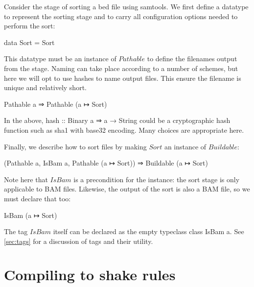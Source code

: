 \documentclass{article}
\begin{document}
\begin{example}
  \label{ex:sort}
  Consider the stage of sorting a bed file using samtools. We first define a
  datatype to represent the sorting stage and to carry all configuration options
  needed to perform the sort:
  \begin{haskell*}
    data Sort = Sort
  \end{haskell*}
  
  This datatype must be an instance of $Pathable$ to define the filenames output
  from the stage. Naming can take place according to a number of schemes, but
  here we will opt to use hashes to name output files. This ensure the filename
  is unique and relatively short.
  \begin{haskell*}
     Pathable a ⇒ Pathable (a ↦ Sort) 
  \end{haskell*}
  In the above, \<hash :: Binary a ⇒ a → String\> could be a cryptographic hash
  function such as sha1 with base32 encoding. Many choices are appropriate here.

  Finally, we describe how to sort files by making $Sort$ an instance of
  $Buildable$:
  \begin{haskell*}
     (Pathable a, IsBam a, Pathable (a ↦ Sort)) ⇒ Buildable (a ↦ Sort)  
  \end{haskell*}
  Note here that $IsBam$ is a precondition for the instance: the sort stage is
  only applicable to BAM files. Likewise, the output of the sort is also a BAM
  file, so we must declare that too:
  \begin{haskell*}
     IsBam (a ↦ Sort)
  \end{haskell*}
  The tag $IsBam$ itself can be declared as the empty typeclass \<class IsBam
  a\>. See \cref{sec:tags} for a discussion of tags and their utility.
\end{example}

\section{Compiling to shake rules}
\end{document}
